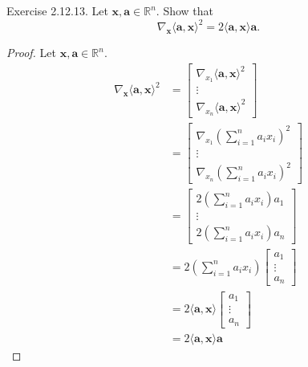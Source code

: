 \documentclass{article}
\theoremstyle{plain}
\begin{document}
\begin{itembox}[l]{Exercise 2.12.13.}
	Let
	\begin{math}
		\bm{x} , \bm{a} \in \mathbb{R}^n .
	\end{math}
	Show that
	\begin{equation*}
		\nabla_{\bm{x}} \langle \bm{a} , \bm{x} \rangle^2 = 2 \langle \bm{a} , \bm{x} \rangle \bm{a} .
	\end{equation*}
\end{itembox}


\begin{proof}
	Let
	\begin{math}
		\bm{x} , \bm{a} \in \mathbb{R}^n .
	\end{math}
	\begin{equation*}
		\begin{split}
			\nabla_{\bm{x}} \langle \bm{a} , \bm{x} \rangle^2 &=
			\begin{bmatrix}
				\nabla_{x_1} \langle \bm{a} , \bm{x} \rangle^2 \\
				\vdots \\
				\nabla_{x_n} \langle \bm{a} , \bm{x} \rangle^2
			\end{bmatrix} \\
			&=
			\begin{bmatrix}
				\nabla_{x_1} (\sum_{i=1}^n a_i x_i)^2 \\
				\vdots \\
				\nabla_{x_n} (\sum_{i=1}^n a_i x_i)^2
			\end{bmatrix} \\
			&=
			\begin{bmatrix}
				2 (\sum_{i=1}^n a_i x_i) a_1 \\
				\vdots \\
				2 (\sum_{i=1}^n a_i x_i) a_n
			\end{bmatrix} \\
			&= 2 \left( \sum_{i=1}^n a_i x_i \right)
			\begin{bmatrix}
				a_1 \\
				\vdots \\
				a_n
			\end{bmatrix} \\
			&= 2 \langle \bm{a} , \bm{x} \rangle
			\begin{bmatrix}
				a_1 \\
				\vdots \\
				a_n
			\end{bmatrix} \\
			&= 2 \langle \bm{a} , \bm{x} \rangle \bm{a}
		\end{split}
	\end{equation*}
\end{proof}
\end{document}
